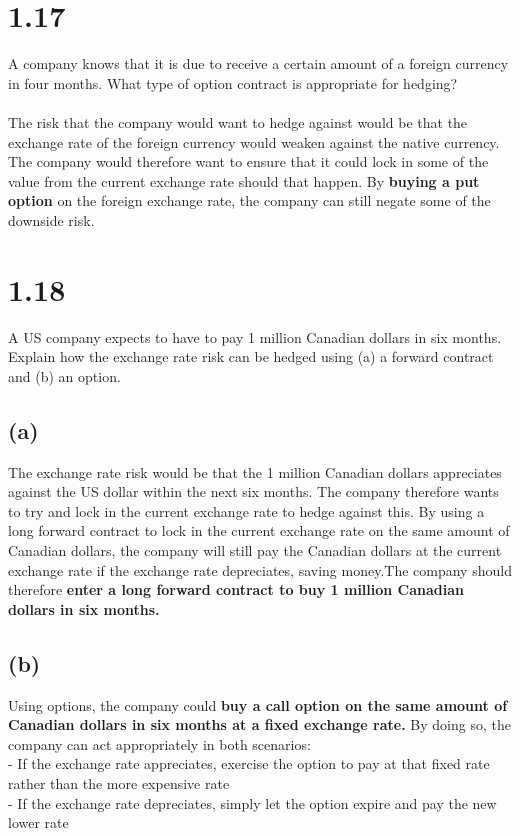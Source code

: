 \documentclass{article}
\begin{document}
\thispagestyle{firstpageheader}
{\Large 

\section*{1.17}

A company knows that it is due to receive a certain amount of a foreign currency in four months. What type of option contract is appropriate for hedging? \\ \\ 
The risk that the company would want to hedge against would be that the exchange rate of the foreign currency would weaken against the native currency. The company would therefore want to ensure that it could lock in some of the value from the current exchange rate should that happen. By \textbf{buying a put option} on the foreign exchange rate, the company can still negate some of the downside risk.

}
{\Large 

\section*{1.18}

A US company expects to have to pay 1 million Canadian dollars in six months. Explain how the exchange rate risk can be hedged using (a) a forward contract and (b) an option.

\subsection*{(a)}

The exchange rate risk would be that the 1 million Canadian dollars appreciates against the US dollar within the next six months. The company therefore wants to try and lock in the current exchange rate to hedge against this. By using a long forward contract to lock in the current exchange rate on the same amount of Canadian dollars, the company will still pay the Canadian dollars at the current exchange rate if the exchange rate depreciates, saving money.The company should therefore \textbf{enter a long forward contract to buy 1 million Canadian dollars in six months.}

\subsection*{(b)}

Using options, the company could \textbf{buy a call option on the same amount of Canadian dollars in six months at a fixed exchange rate.} By doing so, the company can act appropriately in both scenarios: \\
- If the exchange rate appreciates, exercise the option to pay at that fixed rate rather than the more expensive rate \\
- If the exchange rate depreciates, simply let the option expire and pay the new lower rate

}
\end{document}
